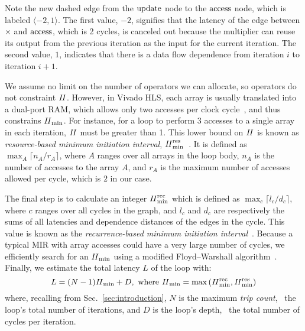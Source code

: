 Note the new dashed edge from the $\operatorname{\mathrm{update}}$ node to the $\operatorname{\mathrm{access}}$ node,
which is labeled $\langle -2, 1 \rangle$.  The first value, $-2$, signifies
that the latency of the edge between $\times$ and $\operatorname{\mathrm{access}}$, which is 2
cycles, is canceled out because the multiplier can reuse its output from the
previous iteration as the input for the current iteration. The second value,
$1$, indicates that there is a data flow dependence from iteration $i$ to
iteration $i+1$.

We assume no limit on the number of operators we can allocate, so operators
do not constraint $\mathit{II}$.  However, in Vivado HLS, each array is usually
translated into a dual-port RAM, which allows only two accesses per clock
cycle~\cite{vivado_hls}, and thus constrains $\mathit{II}_{\rm min}$.  For instance, for a
loop to perform 3 accesses to a single array in each iteration, $\mathit{II}$ must be
greater than 1.  This lower bound on $\mathit{II}$ is known as \emph{resource-based
minimum initiation interval}, $\mathit{II}_{\rm min}^{\rm res}$~\cite{rau94}. It is defined as $\max_A
\lceil {n_A}/{r_A} \rceil$, where $A$ ranges over all arrays in the loop body,
$n_A$ is the number of accesses to the array $A$, and $r_A$ is the maximum
number of accesses allowed per cycle, which is $2$ in our case.

The final step is to calculate an integer $\mathit{II}_{\rm min}^{\rm rec}$ which is defined as
$\max_c \lceil {l_c}/{d_c} \rceil$, where $c$ ranges over all cycles in
the graph, and $l_c$ and $d_c$ are respectively the sums of all latencies
and dependence distances of the edges in the cycle. This value is known
as the \emph{recurrence-based minimum initiation interval}~\cite{rau94}.
Because a typical MIR with array accesses could have a very large number of
cycles, we efficiently search for an $\mathit{II}_{\rm min}$ using a modified Floyd--Warshall
algorithm~\cite{rau94}.  Finally, we estimate the total latency $L$ of the loop
with:
\begin{equation}
    L = (N - 1) \mathit{II}_{\rm min} + D,
    \text{~where~}
        \mathit{II}_{\rm min} = \max\left(\mathit{II}_{\rm min}^{\rm rec}, \mathit{II}_{\rm min}^{\rm res}\right)
    \nonumber
\end{equation}
where, recalling from Sec.~\ref{sec:introduction}, $N$ is the maximum
\emph{trip count}, \ie~the loop's total number of iterations, and $D$ is the
loop's depth, \ie~the total number of cycles per iteration.

